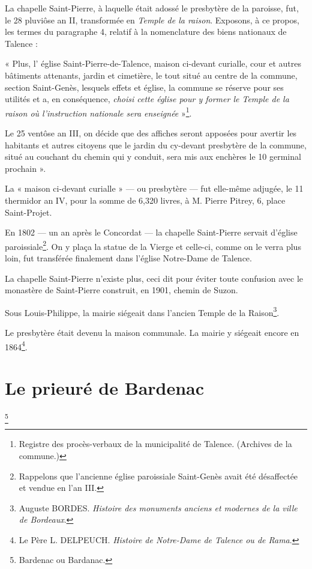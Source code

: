 \documentclass[a4paper,11pt]{book}
\begin{document}
La chapelle Saint-Pierre, à laquelle était adossé le presbytère de la paroisse, fut, le 28 pluviôse an II, transformée en \textit{Temple de la raison}. Exposons, à ce propos, les termes du paragraphe 4, relatif à la nomenclature des biens nationaux de Talence :

« Plus, l' église Saint-Pierre-de-Talence, maison ci-devant curialle, cour et autres bâtiments attenants, jardin et cimetière, le tout situé au centre de la commune, section Saint-Genès, lesquels effets et église, la commune se réserve pour ses utilités et a, en conséquence, \textit{choisi cette église pour y former le Temple de la raison où l'instruction nationale sera enseignée} »\footnote{Registre des procès-verbaux de la municipalité de Talence. (Archives de la commune.)}.

Le 25 ventôse an III, on décide que des affiches seront apposées pour avertir les habitants et autres citoyens que le jardin du cy-devant presbytère de la commune, situé au couchant du chemin qui y conduit, sera mis aux enchères le 10 germinal prochain ».

La « maison ci-devant curialle » — ou presbytère — fut elle-même adjugée, le 11 thermidor an IV, pour la somme de 6,320 livres, à M. Pierre Pitrey, 6, place Saint-Projet.

En 1802 — un an après le Concordat — la chapelle Saint-Pierre servait d'église paroissiale\footnote{Rappelons que l'ancienne église paroissiale Saint-Genès avait été désaffectée et vendue en l'an III.}. On y plaça la statue de la Vierge et celle-ci, comme on le verra plus loin, fut transférée finalement dans l'église Notre-Dame de Talence.

La chapelle Saint-Pierre n'existe plus, ceci dit pour éviter toute confusion avec le monastère de Saint-Pierre construit, en 1901, chemin de Suzon.

Sous Louis-Philippe, la mairie siégeait dans l'ancien Temple de la Raison\footnote{Auguste BORDES. \textit{Histoire des monuments anciens et modernes de la ville de Bordeaux}.}.

Le presbytère était devenu la maison communale. La mairie y siégeait encore en 1864\footnote{Le Père L. DELPEUCH. \textit{Histoire de Notre-Dame de Talence ou de Rama}.}.

\section{Le prieuré de Bardenac}\footnote{Bardenac ou Bardanac.}
\end{document}
